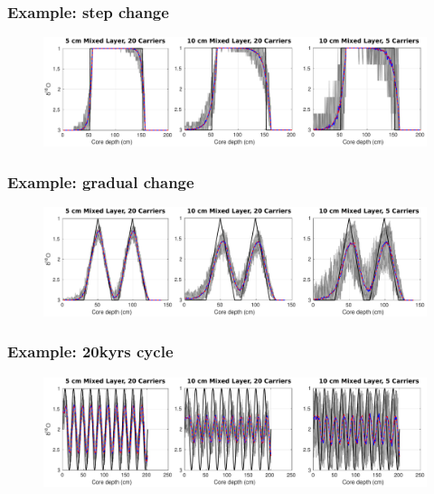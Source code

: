 \documentclass{beamer}
\begin{document}
\begin{frame}
\frametitle{Example: step change}
\begin{figure}[hbtp]
\hspace*{-0.8cm}\includegraphics[width=1.1\textwidth]{figures/JustABU_stepchange.pdf}%
\end{figure}
\end{frame}

\begin{frame}
\frametitle{Example: gradual change}
\begin{figure}[hbtp]
\hspace*{-0.8cm}\includegraphics[width=1.1\textwidth]{figures/JustABU_gradualchange.pdf}%
\end{figure}
\end{frame}

\begin{frame}
\frametitle{Example: 20kyrs cycle}
\begin{figure}[hbtp]
\hspace*{-0.8cm}\includegraphics[width=1.1\textwidth]{figures/JustABU_20kyr_cycle.pdf}%
\end{figure}
\end{frame}
\end{document}
